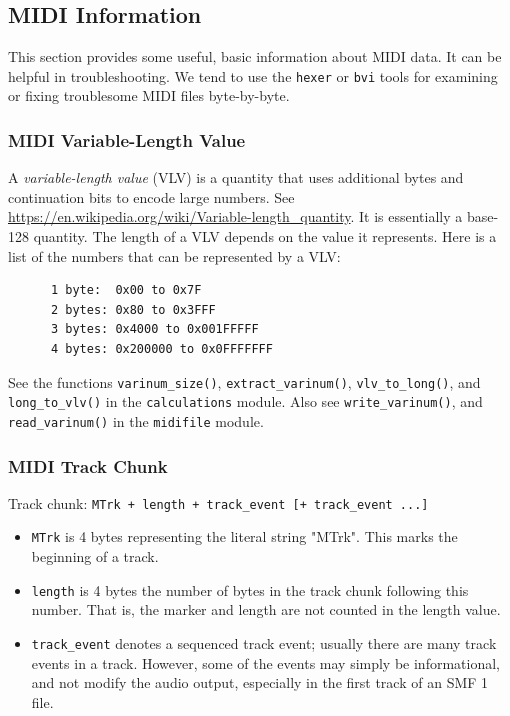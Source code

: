 \subsection{MIDI Information}
\label{subsec:midi_information}

   This section provides some useful, basic information about MIDI data.
   It can be helpful in troubleshooting.  We tend to use the
   \texttt{hexer} or \texttt{bvi} tools for examining or fixing
   troublesome MIDI files byte-by-byte.

\subsubsection{MIDI Variable-Length Value}
\label{subsubsec:midi_variable_length_value}

   A \textsl{variable-length value} (VLV) is a quantity that uses additional
   bytes and continuation bits to encode large numbers.
   See \url{https://en.wikipedia.org/wiki/Variable-length\_quantity}.
   It is essentially a base-128 quantity.
   The length of a VLV depends on the value it represents.
   Here is a list of the numbers that can be represented by a VLV:

   \begin{verbatim}
      1 byte:  0x00 to 0x7F
      2 bytes: 0x80 to 0x3FFF
      3 bytes: 0x4000 to 0x001FFFFF
      4 bytes: 0x200000 to 0x0FFFFFFF
   \end{verbatim}

   See the functions
   \texttt{varinum\_size()},
   \texttt{extract\_varinum()},
   \texttt{vlv\_to\_long()}, and
   \texttt{long\_to\_vlv()}
   in the \texttt{calculations} module.
   Also see \texttt{write\_varinum()}, and
   \texttt{read\_varinum()} in the \texttt{midifile} module.

\subsubsection{MIDI Track Chunk}
\label{subsubsec:midi_track_chunk}

   Track chunk:
   \texttt{MTrk + length + track\_event [+ track\_event ...]}

   \begin{itemize}
      \item \texttt{MTrk} is 4 bytes representing the literal string "MTrk".
         This marks the beginning of a track.
      \item \texttt{length} is 4 bytes the number of bytes in the track
         chunk following this number.  That is, the marker and length are
         not counted in the length value.
      \item \texttt{track\_event} denotes a sequenced track event; usually
         there are many track events in a track.  However, some of the
         events may simply be informational, and not modify the audio
         output, especially in the first track of an SMF 1 file.
   \end{itemize}

